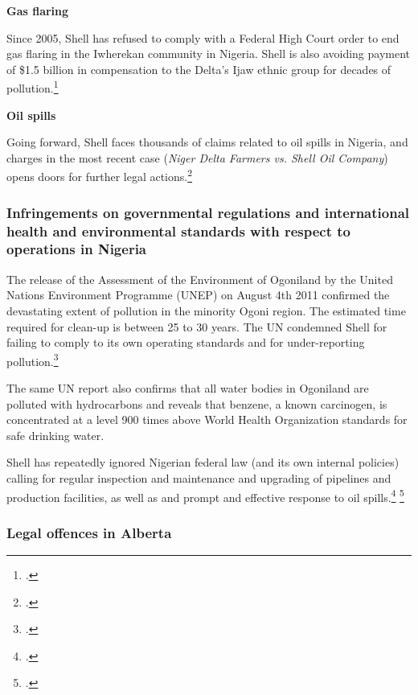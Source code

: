 \textbf{Gas flaring}



Since 2005, Shell has refused to comply with a Federal High Court order to end gas flaring in the Iwherekan community in Nigeria. 
Shell is also avoiding payment of \$1.5 billion in compensation to the Delta’s Ijaw ethnic group for decades of pollution.\footcite[][]{Ukala_2011}



\textbf{Oil spills}



Going forward, Shell faces thousands of claims related to oil spills in Nigeria, and charges in the most recent case (\emph{Niger Delta Farmers vs. Shell Oil Company}) opens doors for further legal actions.\footcite[][]{MixedVerdict}



	\subsubsection{Infringements on governmental regulations and international health and environmental standards with respect to operations in Nigeria}
	
	
	
The release of the Assessment of the Environment of Ogoniland by the United Nations Environment Programme (UNEP) on August 4th 2011 confirmed the devastating extent of pollution in the minority Ogoni region. 
The estimated time required for clean-up is between 25 to 30 years. 
The UN condemned Shell for failing to comply to its own operating standards and for under-reporting pollution.\footcite[][]{Ogoniland}



The same UN report also confirms that all water bodies in Ogoniland are polluted with hydrocarbons and reveals that benzene, a known carcinogen, is concentrated at a level 900 times above World Health Organization standards for safe drinking water.



Shell has repeatedly ignored Nigerian federal law (and its own internal policies) calling for regular inspection and maintenance and upgrading of pipelines and production facilities, as well as and prompt and effective response to oil spills.\footcite[][]{Steiner_2008}  \footcite[][]{Steiner_2010}



	\subsubsection{Legal offences in Alberta}
	


